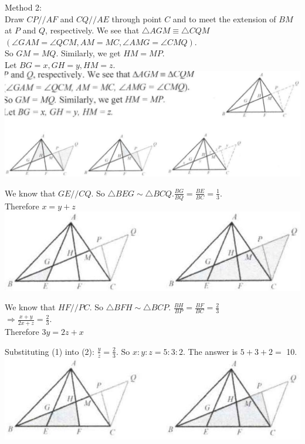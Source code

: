 \documentclass{article}
\begin{document}
Method 2:\\
Draw \(C P / / A F\) and \(C Q / / A E\) through point \(C\) and to meet the extension of \(B M\) at \(P\) and \(Q\), respectively. We see that \(\triangle A G M \equiv \triangle C Q M\)\\
\((\angle G A M=\angle Q C M, A M=M C, \angle A M G=\angle C M Q)\).\\
So \(G M=M Q\). Similarly, we get \(H M=M P\).\\
Let \(B G=x, G H=y, H M=z\).\\
\centering
\includegraphics[width=\textwidth]{images/119(2).jpg}

We know that \(G E / / C Q\). So \(\triangle B E G \sim \triangle B C Q . \frac{B G}{B Q}=\frac{B E}{B C}=\frac{1}{3}\).\\
Therefore \(x=y+z\)\\
\centering
\includegraphics[width=\textwidth]{images/119(1).jpg}

We know that \(H F / / P C\). So \(\triangle B F H \sim \triangle B C P\). \(\frac{B H}{B P}=\frac{B F}{B C}=\frac{2}{3}\)\\
\(\Rightarrow \frac{x+y}{2 x+z}=\frac{2}{3}\).\\
Therefore \(3 y=2 z+x\)


Substituting (1) into (2): \(\frac{y}{z}=\frac{2}{3}\). So \(x: y: z=5: 3: 2\). The answer is \(5+3+2=\) 10.\\
\centering
\includegraphics[width=\textwidth]{images/120(2).jpg}
\end{document}
